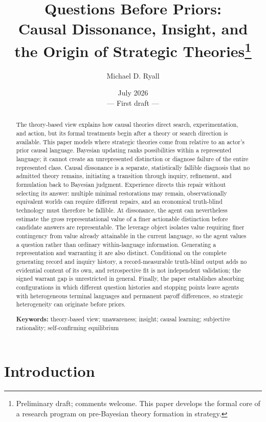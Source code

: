 \documentclass[11pt]{article}
\title{\textbf{Questions Before Priors:}\\
Causal Dissonance, Insight, and the Origin of Strategic Theories\thanks{%
Preliminary draft; comments welcome.  This paper develops the formal core of
a research program on pre-Bayesian theory formation in strategy.}}
\author{Michael D. Ryall}
\date{July 2026\\[0.4em]\normalsize --- First draft ---}
\theoremstyle{definition}
\begin{document}
\maketitle

\begin{abstract}
\noindent The theory-based view explains how causal theories direct search, experimentation, and action, but its formal treatments begin after a theory or search direction is available.
This paper models where strategic theories come from relative to an actor's prior causal language.
Bayesian updating ranks possibilities within a represented language; it cannot create an unrepresented distinction or diagnose failure of the entire represented class.
Causal dissonance is a separate, statistically fallible diagnosis that no admitted theory remains, initiating a transition through inquiry, refinement, and formulation back to Bayesian judgment.
Experience directs this repair without selecting its answer: multiple minimal restorations may remain, observationally equivalent worlds can require different repairs, and an economical truth-blind technology must therefore be fallible.
At dissonance, the agent can nevertheless estimate the gross representational value of a finer actionable distinction before candidate answers are representable.
The leverage object isolates value requiring finer contingency from value already attainable in the current language, so the agent values a question rather than ordinary within-language information.
Generating a representation and warranting it are also distinct.
Conditional on the complete generating record and inquiry history, a record-measurable truth-blind output adds no evidential content of its own, and retrospective fit is not independent validation; the signed warrant gap is unrestricted in general.
Finally, the paper establishes absorbing configurations in which different question histories and stopping points leave agents with heterogeneous terminal languages and permanent payoff differences, so strategic heterogeneity can originate before priors.
\medskip

\noindent\textbf{Keywords:} theory-based view; unawareness; insight; causal learning; subjective rationality; self-confirming equilibrium
\end{abstract}

\newpage

\section{Introduction}
\label{sec:intro}
\end{document}
